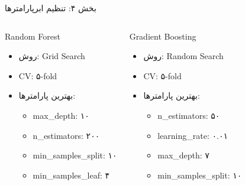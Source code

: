\documentclass[aspectratio=169]{beamer}
\begin{document}
\begin{frame}{بخش ۴: تنظیم ابرپارامترها}
\begin{columns}
\begin{block}{Random Forest}
\begin{itemize}
\item روش: Grid Search
\item CV: ۵-fold
\item بهترین پارامترها:
\begin{itemize}
\item max\_depth: ۱۰
\item n\_estimators: ۲۰۰
\item min\_samples\_split: ۱۰
\item min\_samples\_leaf: ۴
\end{itemize}
\end{itemize}
\end{block}

\begin{block}{Gradient Boosting}
\begin{itemize}
\item روش: Random Search
\item CV: ۵-fold
\item بهترین پارامترها:
\begin{itemize}
\item n\_estimators: ۵۰
\item learning\_rate: ۰.۰۱
\item max\_depth: ۷
\item min\_samples\_split: ۱۰
\end{itemize}
\end{itemize}
\end{block}
\end{columns}
\end{frame}
\end{document}
